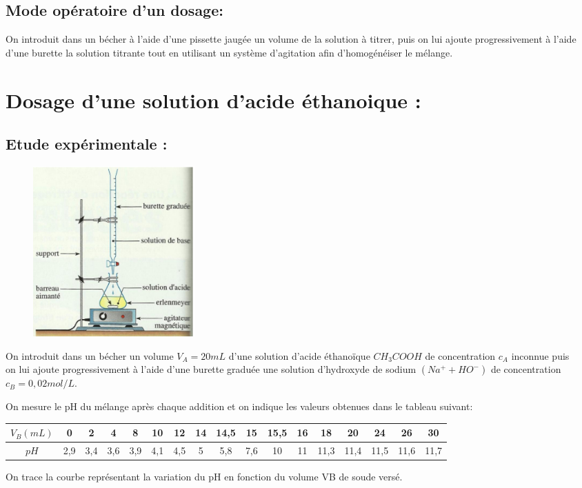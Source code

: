 \documentclass[12pt]{article}
\begin{document}
\subsection{Mode opératoire d'un dosage: }
On introduit dans un bécher à l'aide d'une pissette jaugée un volume de la solution à titrer, puis on lui ajoute progressivement à
l'aide d'une burette la solution titrante tout en utilisant un système d'agitation afin d'homogénéiser le mélange.

\section{Dosage d'une solution d'acide éthanoique : }
\subsection{Etude expérimentale : }

\begin{figure}
	\vspace{-3.8cm}
	\includegraphics[width=0.3\textwidth]{./img/dosage00.png}
\end{figure}


On introduit dans un bécher un volume $V_A=20mL$ d'une solution d'acide éthanoïque $CH_3COOH$ de concentration $c_A$ inconnue puis
\\on lui ajoute progressivement à l'aide d'une burette graduée une solution d'hydroxyde de sodium $(Na^+ + HO^-)$ de concentration $c_B=0,02mol/L$.

On mesure le pH du mélange après chaque addition et on indique les valeurs obtenues dans le tableau suivant:


\begin{tabular}{|c|c|c|c|c|c|c|c|c|c|c|c|c|c|c|c|c|}
	\hline
	$V_B(mL)$ & 0& 2 &4&8&10&12&14&14,5&15&15,5&16&18&20&24&26&30\\\hline
	$pH$&2,9&3,4&3,6&3,9&4,1&4,5&5&5,8&7,6&10&11&11,3&11,4&11,5&11,6&11,7\\\hline
\end{tabular}
On trace la courbe représentant la variation du pH en fonction du volume VB de soude versé.
\end{document}
